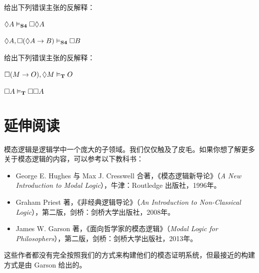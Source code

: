\problempart
给出下列错误主张的反解释：


\begin{compactlist}
	\item $\Diamond A\vDash_{\mathbf{S4}} \Box\Diamond A$
	\item $\Diamond A, \Box (\Diamond A \rightarrow B)\vDash_{\mathbf{S4}}\Box B$
\end{compactlist}

\problempart
给出下列错误主张的反解释：


\begin{compactlist}
	\item $\Box (M\rightarrow O),\Diamond M\vDash_{\mathbf{T}} O$
	\item $\Box A\vDash_{\mathbf{T}} \Box \Box A$
\end{compactlist}

\section*{延伸阅读}

模态逻辑是逻辑学中一个庞大的子领域。我们仅仅触及了皮毛。如果你想了解更多关于模态逻辑的内容，可以参考以下教科书：

\begin{itemize}
	\item George E. Hughes 与 Max J. Cresswell 合著，《模态逻辑新导论》（\textit{A New Introduction to Modal Logic}），牛津：Routledge 出版社，1996年。
	\item Graham Priest 著，《非经典逻辑导论》（\textit{An Introduction to Non-Classical Logic}），第二版，剑桥：剑桥大学出版社，2008年。
	\item James W. Garson 著，《面向哲学家的模态逻辑》（\textit{Modal Logic for Philosophers}），第二版，剑桥：剑桥大学出版社，2013年。
\end{itemize}

这些作者都没有完全按照我们的方式来构建他们的模态证明系统，但最接近的构建方式是由 Garson 给出的。
